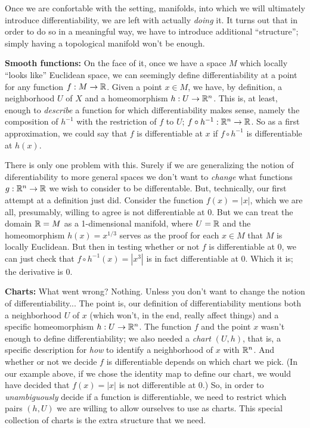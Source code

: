 \msk

Once we are confortable with the setting, manifolds, into which we will ultimately introduce
differentiability, we are left with actually {\it doing} it. It turns out that in order
to do so in a meaningful way, we have to introduce additional ``structure''; simply
having a topological manifold won't be enough.

\ssk

{\bf Smooth functions:} On the face of it, once we have a space $M$ which locally 
``looks like'' Euclidean space,
we can seemingly define differentiability at a point for any function $f:M\rightarrow {\Bbb R}$.
Given a point $x\in M$, we have, by definition, a neighborhood $U$ of $X$ and a
homeomorphism $h:U\rightarrow {\Bbb R}^n$. This is, at least, enough to {\it describe}
a function for which differentiability makes sense, namely the composition
of $h^{-1}$ with the restriction of $f$ to $U$; $f\circ h^{-1}:{\Bbb R}^n\rightarrow {\Bbb R}$.
So as a first approximation, we could say that $f$ is differentiable at $x$ if 
$f\circ h^{-1}$ is differentiable at $h(x)$.

\ssk

There is only one problem with this. Surely if we are generalizing the notion of 
diferentiability to more general spaces we don't want to {\it change} what functions
$g:{\Bbb R}^n\rightarrow {\Bbb R}$ we wish to consider to be differentable. But, technically,
our first attempt at a definition just did. Consider the function $f(x)=|x|$, which 
we are all, presumably, willing to agree is not differentiable at $0$. But we can 
treat the domain ${\Bbb R} = M$ as a 1-dimensional manifold, where $U={\Bbb R}$ and
the homeomorphism $h(x)=x^{1/3}$ serves as the proof for each $x\in M$ that $M$
is locally Euclidean. But then in testing whether or not $f$ is differentiable 
at $0$, we can just check that $f\circ h^{-1}(x) = |x^3|$ is in fact differentiable
at $0$. Which it is; the derivative is $0$.


{\bf Charts:} What went wrong? Nothing. Unless you don't want to change the notion of 
differentiability... The point is, our definition of differentiability mentions
both a neighborhood $U$ of $x$ (which won't, in the end, really affect things)
and a specific homeomorphism $h:U\rightarrow {\Bbb R}^n$. The function $f$ and the point
$x$ wasn't enough to define differentiability; we also needed a {\it chart}
$(U,h)$, that is, a specific description for {\it how} to identify a neighborhood
of $x$ with ${\Bbb R}^n$. And whether or not we decide $f$ is differentiable depends
on which chart we pick. (In our example above, if we chose the identity map to define
our chart, we would have decided that $f(x)=|x|$ is not differentible at $0$.)
So, in order to {\it unambiguously} decide if a function is differentiable, we
need to restrict which pairs $(h,U)$ we are willing to allow ourselves to use 
as charts. This special collection of charts is the extra structure that we need.

